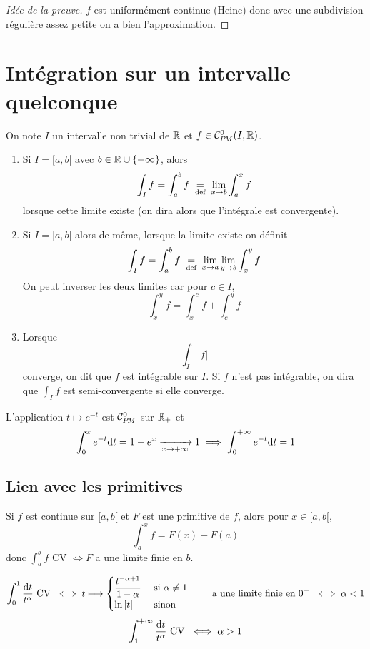 \begin{proof}[Idée de la preuve]
    $f$ est uniformément continue (Heine) donc avec une subdivision régulière assez petite on a bien l'approximation.
\end{proof}

\section{Intégration sur un intervalle quelconque}

On note $I$ un intervalle non trivial de $\mathbb R$ et $f\in\CPM(I, \R)$.

\begin{dfn}
    \begin{enumerate}
        \item Si $I=[a, b[$ avec $b\in\mathbb R\cup \{+\infty\}$, alors \[
                \int_If=\int_a^bf\;\underset{\text{def}}=\;\lim_{x\to b}\int_a^xf
            \]
            lorsque cette limite existe (on dira alors que l'intégrale est convergente).
        \item Si $I=]a, b[$ alors de même, lorsque la limite existe on définit \[
                \int_If=\int_a^bf\;\underset{\text{def}}=\; \lim_{x\to a}\lim_{y\to b}\int_x^yf
            \]
            On peut inverser les deux limites car pour $c\in I$, \[
                \int_x^yf=\int_x^cf+\int_c^yf
            \]
        \item Lorsque \[
                \int_I|f|
            \]
            converge, on dit que $f$ est intégrable sur $I$. Si $f$ n'est pas intégrable, on dira que $\displaystyle\int_If$ est semi-convergente si elle converge.
    \end{enumerate}
\end{dfn}

\begin{ex}
    L'application $t\longmapsto e^{-t}$ est $\CPM$ sur $\mathbb R_+$ et \[
        \int_0^x e^{-t}\mathrm{d} t=1-e^x\xrightarrow[x\to+\infty]{}1\implies \int_0^{+\infty}e^{-t}\mathrm{d} t=1
    \]
\end{ex}

\subsection{Lien avec les primitives}

Si $f$ est continue sur $[a, b[$ et $F$ est une primitive de $f$, alors pour $x\in[a, b[$, \[
    \int_a^xf=F(x)-F(a)
\]
donc $\int_a^b f$ CV $\iff F$ a une limite finie en $b$.

\begin{ex}
    \[
        \int_0^1\frac{\mathrm{d} t}{t^\alpha}\text{ CV }\iff t\longmapsto \begin{cases}
            \dfrac{t^{-\alpha+1}}{1-\alpha} &\text{ si }\alpha\neq 1\\\ln|t|&\text{ sinon }
        \end{cases}
        \qquad \text{ a une limite finie en $0^+$ }
        \iff \alpha<1
    \]
    \[
        \int_1^{+\infty}\frac{\mathrm{d} t}{t^\alpha}\text{ CV }\iff \alpha>1
    \]
\end{ex}

